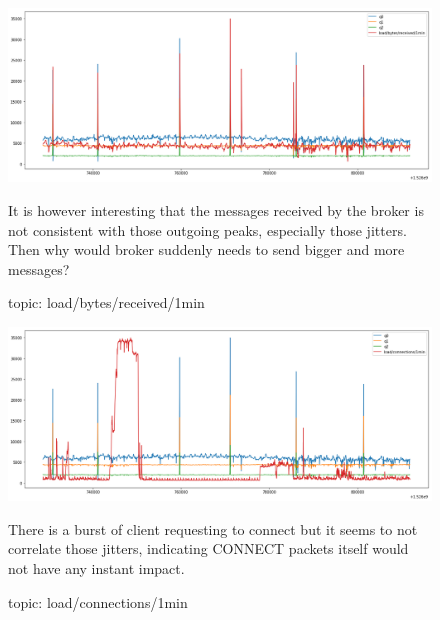\documentclass[12pt, letterpaper]{article}
\begin{document}
\begin{figure}
	\setlength{\tabcolsep}{0pt}
	\caption{topic: load/bytes/received/1min}
	\label{f:valid_cnt_load_bytes_received_1min}
	\begin{center}
		\includegraphics[width=\textwidth]{valid_cnt/valid_cnt-load_bytes_received_1min}	
	\end{center}
	It is however interesting that the messages received by the broker is not consistent with those outgoing peaks, especially those jitters. Then why would broker suddenly needs to send bigger and more messages?
\end{figure}

\begin{figure}
	\setlength{\tabcolsep}{0pt}
	\caption{topic: load/connections/1min}
	\label{f:valid_cnt_load_connections_1min}
	\begin{center}
		\includegraphics[width=\textwidth]{valid_cnt/valid_cnt-load_connections_1min}	
	\end{center}
	There is a burst of client requesting to connect but it seems to not correlate those jitters, indicating CONNECT packets itself would not have any instant impact.
\end{figure}
\end{document}
